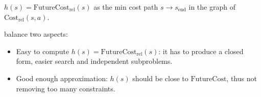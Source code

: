  $h(s) = \text{FutureCost}_\text{rel}(s)$ as the min cost
path $s \rightarrow s_{\text{end}}$ in the graph of
$\text{Cost}_\text{rel}(s,a)$.

 balance two aspects:
\begin{itemize}
    \item Easy to compute $h(s) = \text{FutureCost}_\text{rel}(s)$: it has to
        produce a closed form, easier search and independent subproblems.
    \item Good enough approximation: $h(s)$ should be close to
        $\text{FutureCost}$, thus not removing too many constraints.
\end{itemize}